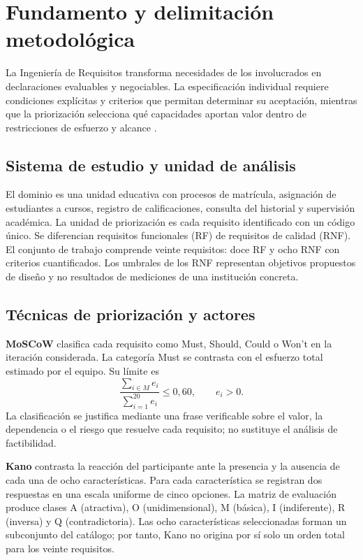\section{Fundamento y delimitación metodológica}
La Ingeniería de Requisitos transforma necesidades de los involucrados en declaraciones evaluables y negociables. La especificación individual requiere condiciones explícitas y criterios que permitan determinar su aceptación, mientras que la priorización selecciona qué capacidades aportan valor dentro de restricciones de esfuerzo y alcance \cite{iso29148,pohl2025,wiegers2013}.

\subsection{Sistema de estudio y unidad de análisis}
El dominio es una unidad educativa con procesos de matrícula, asignación de estudiantes a cursos, registro de calificaciones, consulta del historial y supervisión académica. La unidad de priorización es cada requisito identificado con un código único. Se diferencian requisitos funcionales (RF) de requisitos de calidad (RNF). El conjunto de trabajo comprende veinte requisitos: doce RF y ocho RNF con criterios cuantificados. Los umbrales de los RNF representan objetivos propuestos de diseño y no resultados de mediciones de una institución concreta.

\subsection{Técnicas de priorización y actores}
\textbf{MoSCoW} clasifica cada requisito como Must, Should, Could o Won't en la iteración considerada. La categoría Must se contrasta con el esfuerzo total estimado por el equipo. Su límite es
\begin{equation}
\frac{\sum_{i\in M}e_i}{\sum_{i=1}^{20}e_i}\leq 0{,}60,\qquad e_i>0.
\label{eq:must}
\end{equation}
La clasificación se justifica mediante una frase verificable sobre el valor, la dependencia o el riesgo que resuelve cada requisito; no sustituye el análisis de factibilidad.

\textbf{Kano} contrasta la reacción del participante ante la presencia y la ausencia de cada una de ocho características. Para cada característica se registran dos respuestas en una escala uniforme de cinco opciones. La matriz de evaluación produce clases A (atractiva), O (unidimensional), M (básica), I (indiferente), R (inversa) y Q (contradictoria). Las ocho características seleccionadas forman un subconjunto del catálogo; por tanto, Kano no origina por sí solo un orden total para los veinte requisitos.

